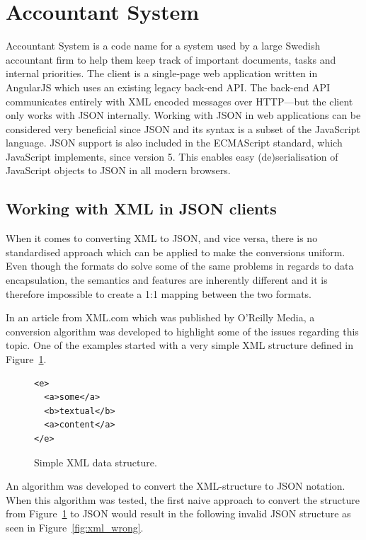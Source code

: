 \documentclass{cslthse-msc}
\begin{document}
\section{Accountant System}

Accountant System is a code name for a system used by a large Swedish accountant firm to help them keep track of important documents, tasks and internal priorities. The client is a single-page web application written in AngularJS which uses an existing legacy back-end API. The back-end API communicates entirely with XML encoded messages over HTTP---but the client only works with JSON internally. Working with JSON in web applications can be considered very beneficial since JSON and its syntax is a subset of the JavaScript language. JSON support is also included in the ECMAScript standard, which JavaScript implements, since version 5\cite{ecmascript_5}. This enables easy (de)serialisation of JavaScript objects to JSON in all modern browsers.

\subsection{Working with XML in JSON clients}
\label{xml_json}

When it comes to converting XML to JSON, and vice versa, there is no standardised approach which can be applied to make the conversions uniform. Even though the formats do solve some of the same problems in regards to data encapsulation, the semantics and features are inherently different and it is therefore impossible to create a 1:1 mapping between the two formats.

In an article from XML.com\cite{xml_json} which was published by O'Reilly Media, a conversion algorithm was developed to highlight some of the issues regarding this topic. One of the examples started with a very simple XML structure defined in Figure~\ref{fig:xml_structure}.

\begin{figure}[H]
  \centering
    \begin{center}
\begin{lstlisting}[breaklines=true,frame=single]
<e>
  <a>some</a>
  <b>textual</b>
  <a>content</a>
</e>
\end{lstlisting}
    \end{center}
  \caption{Simple XML data structure.}
  \label{fig:xml_structure}
\end{figure}

An algorithm was developed to convert the XML-structure to JSON notation. When this algorithm was tested, the first naive approach to convert the structure from Figure~\ref{fig:xml_structure} to JSON would result in the following invalid JSON structure as seen in Figure~\ref{fig:xml_wrong}.
\end{document}
